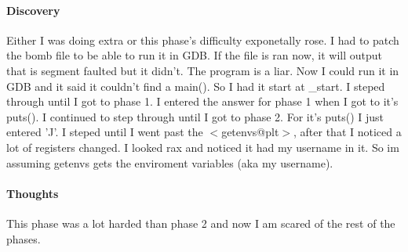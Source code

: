 \documentclass[12pt]{article}
\begin{document}
\paragraph{Discovery}
Either I was doing extra or this phase's difficulty exponetally rose. I had to patch the bomb file to be able to run it in GDB. If the file is ran now, it will output that is segment faulted but it didn't. The program is a liar. Now I could run it in GDB and it said it couldn't find a main(). So I had it start at \_start. I steped through until I got to phase 1. I entered the answer for phase 1 when I got to it's puts(). I continued to step through until I got to phase 2. For it's puts() I just entered 'J'. I steped until I went past the $<$getenvs@plt$>$, after that I noticed a lot of registers changed. I looked rax and noticed it had my username in it. So im assuming getenvs gets the enviroment variables (aka my username).

\paragraph{Thoughts}
This phase was a lot harded than phase 2 and now I am scared of the rest of the phases.
\end{document}
